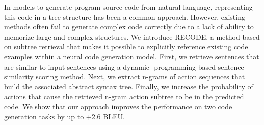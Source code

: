 In models to generate program source code from natural language, representing this code in a tree structure has been a common approach. However, existing methods often fail to generate complex code correctly due to a lack of ability to memorize large and complex structures. We introduce RECODE, a method based on subtree retrieval that makes it possible to explicitly reference existing code examples within a neural code generation model. First, we retrieve sentences that are similar to input sentences using a dynamic- programming-based sentence similarity scoring method. Next, we extract n-grams of action sequences that build the associated abstract syntax tree. Finally, we increase the probability of actions that cause the retrieved n-gram action subtree to be in the predicted code. We show that our approach improves the performance on two code generation tasks by up to +2.6 BLEU.
